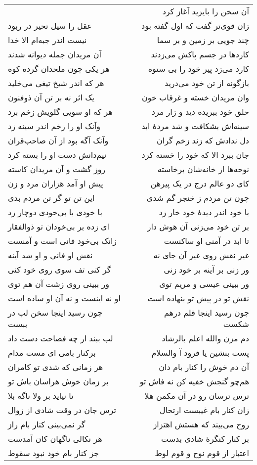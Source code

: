 \begin{center}
\begin{longtable}{l p{0.5cm} r}
&&
آن سخن را بایزید آغاز کرد
\\
عقل را سیل تحیر در ربود
&&
زان قوی‌تر گفت که اول گفته بود
\\
نیست اندر جبه‌ام الا خدا
&&
چند جویی بر زمین و بر سما
\\
آن مریدان جمله دیوانه شدند
&&
کاردها در جسم پاکش می‌زدند
\\
هر یکی چون ملحدان گرده کوه
&&
کارد می‌زد پیر خود را بی ستوه
\\
هر که اندر شیخ تیغی می‌خلید
&&
بازگونه از تن خود می‌درید
\\
یک اثر نه بر تن آن ذوفنون
&&
وان مریدان خسته و غرقاب خون
\\
هر که او سویی گلویش زخم برد
&&
حلق خود ببریده دید و زار مرد
\\
وآنک او را زخم اندر سینه زد
&&
سینه‌اش بشکافت و شد مردهٔ ابد
\\
وآنک آگه بود از آن صاحب‌قران
&&
دل ندادش که زند زخم گران
\\
نیم‌دانش دست او را بسته کرد
&&
جان ببرد الا که خود را خسته کرد
\\
روز گشت و آن مریدان کاسته
&&
نوحه‌ها از خانه‌شان برخاسته
\\
پیش او آمد هزاران مرد و زن
&&
کای دو عالم درج در یک پیرهن
\\
این تن تو گر تن مردم بدی
&&
چون تن مردم ز خنجر گم شدی
\\
با خودی با بی‌خودی دوچار زد
&&
با خود اندر دیدهٔ خود خار زد
\\
ای زده بر بی‌خودان تو ذوالفقار
&&
بر تن خود می‌زنی آن هوش دار
\\
زانک بی‌خود فانی است و آمنست
&&
تا ابد در آمنی او ساکنست
\\
نقش او فانی و او شد آینه
&&
غیر نقش روی غیر آن جای نه
\\
گر کنی تف سوی روی خود کنی
&&
ور زنی بر آینه بر خود زنی
\\
ور ببینی روی زشت آن هم توی
&&
ور ببینی عیسی و مریم توی
\\
او نه اینست و نه آن او ساده است
&&
نقش تو در پیش تو بنهاده است
\\
چون رسید اینجا سخن لب در ببست
&&
چون رسید اینجا قلم درهم شکست
\\
لب ببند ار چه فصاحت دست داد
&&
دم مزن والله اعلم بالرشاد
\\
برکنار بامی ای مست مدام
&&
پست بنشین یا فرود آ والسلام
\\
هر زمانی که شدی تو کامران
&&
آن دم خوش را کنار بام دان
\\
بر زمان خوش هراسان باش تو
&&
هم‌چو گنجش خفیه کن نه فاش تو
\\
تا نیاید بر ولا ناگه بلا
&&
ترس ترسان رو در آن مکمن هلا
\\
ترس جان در وقت شادی از زوال
&&
زان کنار بام غیبست ارتحال
\\
گر نمی‌بینی کنار بام راز
&&
روح می‌بیند که هستش اهتزاز
\\
هر نکالی ناگهان کان آمدست
&&
بر کنار کنگرهٔ شادی بدست
\\
جز کنار بام خود نبود سقوط
&&
اعتبار از قوم نوح و قوم لوط
\\
\end{longtable}
\end{center}
